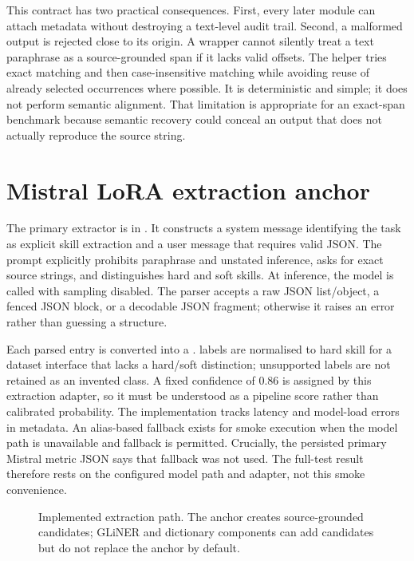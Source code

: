 This contract has two practical consequences. First, every later module can attach metadata without destroying a text-level audit trail. Second, a malformed output is rejected close to its origin. A wrapper cannot silently treat a text paraphrase as a source-grounded span if it lacks valid offsets. The  helper tries exact matching and then case-insensitive matching while avoiding reuse of already selected occurrences where possible. It is deterministic and simple; it does not perform semantic alignment. That limitation is appropriate for an exact-span benchmark because semantic recovery could conceal an output that does not actually reproduce the source string.

\section{Mistral LoRA extraction anchor}

The primary extractor is  in . It constructs a system message identifying the task as explicit skill extraction and a user message that requires valid JSON. The prompt explicitly prohibits paraphrase and unstated inference, asks for exact source strings, and distinguishes hard and soft skills. At inference, the model is called with sampling disabled. The parser accepts a raw JSON list/object, a fenced JSON block, or a decodable JSON fragment; otherwise it raises an error rather than guessing a structure.

Each parsed entry is converted into a .  labels are normalised to hard skill for a dataset interface that lacks a hard/soft distinction; unsupported labels are not retained as an invented class. A fixed confidence of 0.86 is assigned by this extraction adapter, so it must be understood as a pipeline score rather than calibrated probability. The implementation tracks latency and model-load errors in metadata. An alias-based fallback exists for smoke execution when the model path is unavailable and fallback is permitted. Crucially, the persisted primary Mistral metric JSON says that fallback was not used. The full-test result therefore rests on the configured model path and adapter, not this smoke convenience.

\begin{figure}[H]
\centering

\caption{Implemented extraction path. The anchor creates source-grounded candidates; GLiNER and dictionary components can add candidates but do not replace the anchor by default.}
\label{fig:extraction}
\end{figure}

